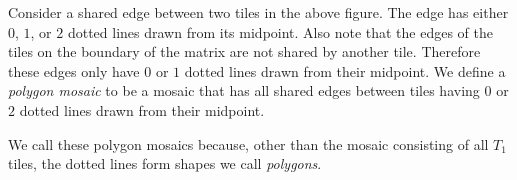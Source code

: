 \documentclass[12pt]{article}
\theoremstyle{plain}
\theoremstyle{definition}
\theoremstyle{remark}
\theoremstyle{definition}
\newcommand{\cell}[4]{ \draw[thick] ( #1 , #2 ) rectangle ( #3 , #4 );}
\newcommand{\cellA}[4]{ \draw[thick] ( #1 , #2 ) rectangle ( #3 , #4 ); \draw[red, thick, densely dotted] (#3 * 0.5 + #1 * 0.5 , #2) -- (#3, #4 * 0.5 + #2 * 0.5);}
\newcommand{\cellB}[4]{ \draw[thick] ( #1 , #2 ) rectangle ( #3 , #4 ); \draw[red, thick, densely dotted] (#3 * 0.5 + #1 * 0.5 , #2) -- (#1, #4 * 0.5 + #2 * 0.5);}
\newcommand{\cellC}[4]{ \draw[thick] ( #1 , #2 ) rectangle ( #3 , #4 ); \draw[red, thick, densely dotted] (#3 * 0.5 + #1 * 0.5 , #4) -- (#1, #4 * 0.5 + #2 * 0.5);}
\newcommand{\cellD}[4]{ \draw[thick] ( #1 , #2 ) rectangle ( #3 , #4 ); \draw[red, thick, densely dotted] (#3 * 0.5 + #1 * 0.5 , #4) -- (#3, #4 * 0.5 + #2 * 0.5);}
\newcommand{\cellE}[4]{ \draw[thick] ( #1 , #2 ) rectangle ( #3 , #4 ); \draw[red, thick, densely dotted] (#3 * 0.5 + #1 * 0.5 , #2) -- (#3 * 0.5 + #1 * 0.5 , #4);}
\newcommand{\cellF}[4]{ \draw[thick] ( #1 , #2 ) rectangle ( #3 , #4 ); \draw[red, thick, densely dotted] (#3, #4 * 0.5 + #2 * 0.5) -- (#1, #4 * 0.5 + #2 * 0.5);}
\begin{document}
\begin{center}
\end{center}

Consider a shared edge between two tiles in the above figure. The edge has either $0$, $1$, or $2$ dotted lines drawn from its midpoint. Also note that the edges of the tiles on the boundary of the matrix are not shared by another tile. Therefore these edges only have $0$ or $1$ dotted lines drawn from their midpoint. We define a \textit{polygon mosaic} to be a mosaic that has all shared edges between tiles having $0$ or $2$ dotted lines drawn from their midpoint.

We call these polygon mosaics because, other than the mosaic consisting of all $T_1$ tiles, the dotted lines form shapes we call \textit{polygons}. 
\end{document}

